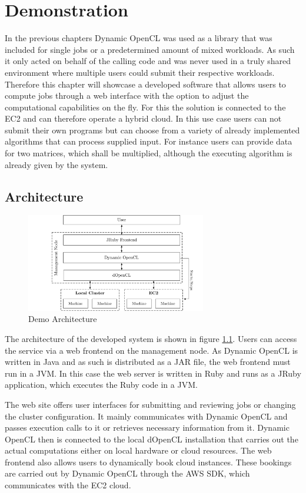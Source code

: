 \chapter{Demonstration}
\label{demonstration}
In the previous chapters Dynamic OpenCL was used as a library that was included for single jobs or a predetermined amount of mixed workloads. As such it only acted on behalf of the calling code and was never used in a truly shared environment where multiple users could submit their respective workloads. Therefore this chapter will showcase a developed software that allows users to compute jobs through a web interface with the option to adjust the computational capabilities on the fly. For this the solution is connected to the EC2 and can therefore operate a hybrid cloud. In this use case users can not submit their own programs but can choose from a variety of already implemented algorithms that can process supplied input. For instance users can provide data for two matrices, which shall be multiplied, although the executing algorithm is already given by the system.

\section{Architecture}

\begin{figure}[!htb]
	\includegraphics[width=0.7\textwidth]{drawings/demo_architecture.pdf}
	\centering
	\caption{Demo Architecture}
	\label{img:demo_architecture}
\end{figure}
The architecture of the developed system is shown in figure \ref{img:demo_architecture}. Users can access the service via a web frontend on the management node. As Dynamic OpenCL is written in Java and as such is distributed as a JAR file, the web frontend must run in a JVM. In this case the web server is written in Ruby and runs as a JRuby application, which executes the Ruby code in a JVM. 

The web site offers user interfaces for submitting and reviewing jobs or changing the cluster configuration. It mainly communicates with Dynamic OpenCL and passes execution calls to it or retrieves necessary information from it. Dynamic OpenCL then is connected to the local dOpenCL installation that carries out the actual computations either on local hardware or cloud resources. The web frontend also allows users to dynamically book cloud instances. These bookings are carried out by Dynamic OpenCL through the AWS SDK, which communicates with the EC2 cloud.
